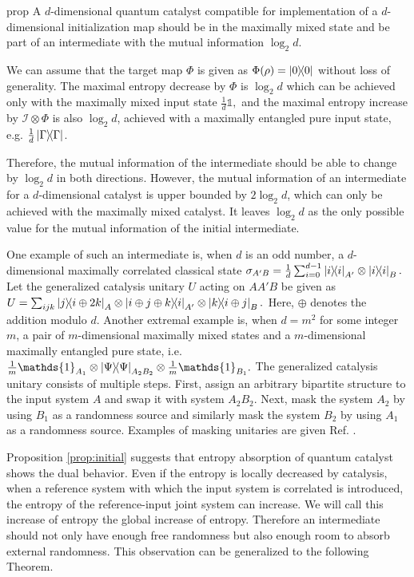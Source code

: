 \documentclass[aps, reprint, amsmath,amssymb, prx, superscriptaddress]{revtex4-2}
\begin{document}
\begin{theoremEnd}{prop} \label{prop:initial}
    A $d$-dimensional quantum catalyst compatible for implementation of a $d$-dimensional initialization map should be in the maximally mixed state and be part of an intermediate with the mutual information $\log_2  d$.
\end{theoremEnd}
\begin{proofEnd}
    We can assume that the target map $\Phi$ is given as $\Phi(\rho)=\dyad{0}$ without loss of generality. The maximal entropy decrease by $\Phi$ is $\log_2  d$ which can be achieved only with the maximally mixed input state $\frac{1}{d}\mathds{1},$ and the maximal entropy increase by $\mathcal{I}\otimes\Phi$ is also $\log_2  d$, achieved with a maximally entangled pure input state, e.g. $\frac{1}{d}\dyad{\Gamma}$.
    
    Therefore, the mutual information of the intermediate should be able to change by $\log_2  d$ in both directions. However, the mutual information of an intermediate for a $d$-dimensional catalyst is upper bounded by $2 \log_2  d$, which can only be achieved with the maximally mixed catalyst. It leaves $\log_2  d$ as the only possible value for the mutual information of the initial intermediate.
\end{proofEnd}
One example of such an intermediate is, when $d$ is an odd number, a $d$-dimensional maximally correlated classical state $\sigma_{A'B}=\frac{1}{d}\sum_{i=0}^{d-1}\dyad{i}_{A'}\otimes\dyad{i}_B.$ Let the generalized catalysis unitary $U$ acting on $AA'B$ be given as $U=\sum_{ijk} \dyad{j}{i \oplus 2k}_A \otimes \dyad{i \oplus j \oplus k}{i}_{A'} \otimes \dyad{k}{i \oplus j}_B.$ Here, $\oplus$ denotes the addition modulo $d$. Another extremal example is, when $d=m^2$ for some integer $m$, a pair of $m$-dimensional maximally mixed states and a $m$-dimensional maximally entangled pure state, i.e. $\frac{1}{m}\mathds{1}_{A_1}\otimes\dyad{\Psi}_{A_2B_2}\otimes \frac{1}{m}\mathds{1}_{B_1}.$ The generalized catalysis unitary consists of multiple steps. First, assign an arbitrary bipartite structure to the input system $A$ and swap it with system $A_2B_2$. Next, mask the system $A_2$ by using $B_1$ as a randomness source and similarly mask the system $B_2$ by using $A_1$ as a randomness source. Examples of masking unitaries are given Ref. \cite{lie2019unconditionally}.

Proposition \ref{prop:initial} suggests that entropy absorption of quantum catalyst shows the dual behavior. Even if the entropy is locally decreased by catalysis, when a reference system with which the input system is correlated is introduced, the entropy of the reference-input joint system can increase. We will call this increase of entropy the global increase of entropy. Therefore an intermediate should not only have enough free randomness but also enough room to absorb external randomness. This observation can be generalized to the following Theorem.
\end{document}
